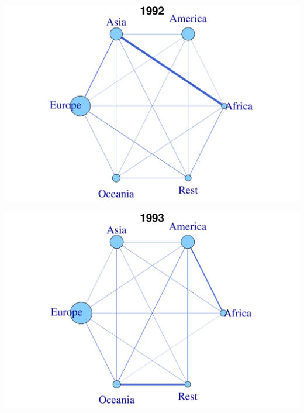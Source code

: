 \documentclass[a4paper,ngerman,oneside,titlepage,bibliography=totoc,11pt]{scrreprt}
\begin{document}
\begin{minipage}[t]{0.48\textwidth}
		\centering
			\includegraphics[width=1\textwidth]{Grafiken/Cont_Ani/cont1.pdf}
\end{minipage}	
\hfill	
\begin{minipage}[t]{0.48\textwidth}	
			\centering
			\includegraphics[width=1\textwidth]{Grafiken/Cont_Ani/cont2.pdf}
\end{minipage}
\end{document}
